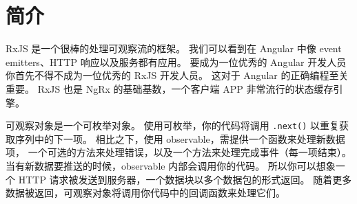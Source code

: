 \section{简介}


RxJS 是一个很棒的处理可观察流的框架。
我们可以看到在 Angular 中像 event emitters、HTTP 响应以及服务都有应用。
要成为一位优秀的 Angular 开发人员你首先不得不成为一位优秀的 RxJS 开发人员。
这对于 Angular 的正确编程至关重要。
RxJS 也是 NgRx 的基础基数，一个客户端 APP 非常流行的状态缓存引擎。


可观察对象是一个可枚举对象。
使用可枚举，你的代码将调用 \texttt{.next()} 以重复获取序列中的下一项。
相比之下，使用 observable，需提供一个函数来处理新数据项，
一个可选的方法来处理错误，以及一个方法来处理完成事件（每一项结束）。
当有新数据要推送的时候，observable 内部会调用你的代码。
所以你可以想象一个 HTTP 请求被发送到服务器，一个数据块以多个数据包的形式返回。
随着更多数据被返回，可观察对象将调用你代码中的回调函数来处理它们。
